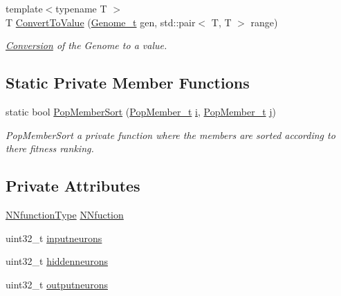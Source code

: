 \begin{DoxyCompactItemize}
{\footnotesize template$<$typename T $>$ }\\T \hyperlink{class_soil_math_1_1_g_a_aa4a6f59bd2e88d432a94d0159b8e8914}{Convert\+To\+Value} (\hyperlink{_soil_math_types_8h_a58f6ab36d2cb0527a73caec36d14a0e0}{Genome\+\_\+t} gen, std\+::pair$<$ T, T $>$ range)
\begin{DoxyCompactList}\small\item\em \hyperlink{class_conversion}{Conversion} of the Genome to a value. \end{DoxyCompactList}\end{DoxyCompactItemize}
\subsection*{Static Private Member Functions}
\begin{DoxyCompactItemize}
\item 
static bool \hyperlink{class_soil_math_1_1_g_a_a1e950022fa3ea792a36cbc62f9b8528b}{Pop\+Member\+Sort} (\hyperlink{_soil_math_types_8h_a7ded6c03705047ebe50207b22395dcd1}{Pop\+Member\+\_\+t} \hyperlink{_v_s_a___u_t_2_comparision_pictures_2_createtest_image_8m_a6f6ccfcf58b31cb6412107d9d5281426}{i}, \hyperlink{_soil_math_types_8h_a7ded6c03705047ebe50207b22395dcd1}{Pop\+Member\+\_\+t} \hyperlink{_v_s_a___u_t_2_comparision_pictures_2_createtest_image_8m_ac86694252f8dfdb19aaeadc4b7c342c6}{j})
\begin{DoxyCompactList}\small\item\em Pop\+Member\+Sort a private function where the members are sorted according to there fitness ranking. \end{DoxyCompactList}\end{DoxyCompactItemize}
\subsection*{Private Attributes}
\begin{DoxyCompactItemize}
\item 
\hyperlink{_soil_math_types_8h_a7791f1b8f92a964847637c5d657c1b10}{N\+Nfunction\+Type} \hyperlink{class_soil_math_1_1_g_a_a9b690048c89c32e3153457378b5e1c31}{N\+Nfuction}
\item 
uint32\+\_\+t \hyperlink{class_soil_math_1_1_g_a_ac32591e30dde5ac854ae57a7b9e33298}{inputneurons}
\item 
uint32\+\_\+t \hyperlink{class_soil_math_1_1_g_a_a3f1eee7492f68a05b9b06ee8afb2ec20}{hiddenneurons}
\item 
uint32\+\_\+t \hyperlink{class_soil_math_1_1_g_a_ab454f9968d5ce2a294b89f85c9d3a74f}{outputneurons}
\end{DoxyCompactItemize}


